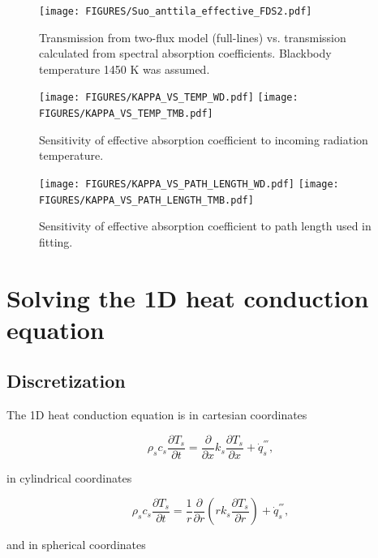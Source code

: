 \begin{figure}[ht]
    \centering
    \texttt{[image: FIGURES/Suo\_anttila\_effective\_FDS2.pdf]}
    \caption{Transmission from two-flux model (full-lines) vs. transmission calculated from spectral absorption coefficients. Blackbody temperature 1450 K was assumed.}
    \label{fig_trans3}
\end{figure}

\begin{figure}[ht]
    \centering
    \texttt{[image: FIGURES/KAPPA\_VS\_TEMP\_WD.pdf]}
    \texttt{[image: FIGURES/KAPPA\_VS\_TEMP\_TMB.pdf]}

    \caption{Sensitivity of effective absorption coefficient to incoming radiation temperature.}
    \label{fig_kapvtemp}
\end{figure}

\begin{figure}[ht]
    \centering
    \texttt{[image: FIGURES/KAPPA\_VS\_PATH\_LENGTH\_WD.pdf]}
    \texttt{[image: FIGURES/KAPPA\_VS\_PATH\_LENGTH\_TMB.pdf]}

    \caption{Sensitivity of effective absorption coefficient to path length used in fitting.}
    \label{fig_kapvPlength}
\end{figure}

\chapter{Solving the 1D heat conduction equation}\label{discretization}

\section{Discretization}
The 1D heat conduction equation is in cartesian coordinates

\begin{equation}
\label{heat_cond_cart}
     \rho_s c_s \frac{\partial T_s}{\partial t} = \frac{\partial}{\partial x} k_s \frac{\partial T_s}{\partial x} + \dot{q}^{'''}_s, 
\end{equation}

in cylindrical coordinates

\begin{equation}
\label{heat_cond_cyl}
     \rho_s c_s \frac{\partial T_s}{\partial t} = \frac{1}{r}\frac{\partial}{\partial r} (r k_s \frac{\partial T_s}{\partial r}) + \dot{q}^{'''}_s, 
\end{equation}

and in spherical coordinates

